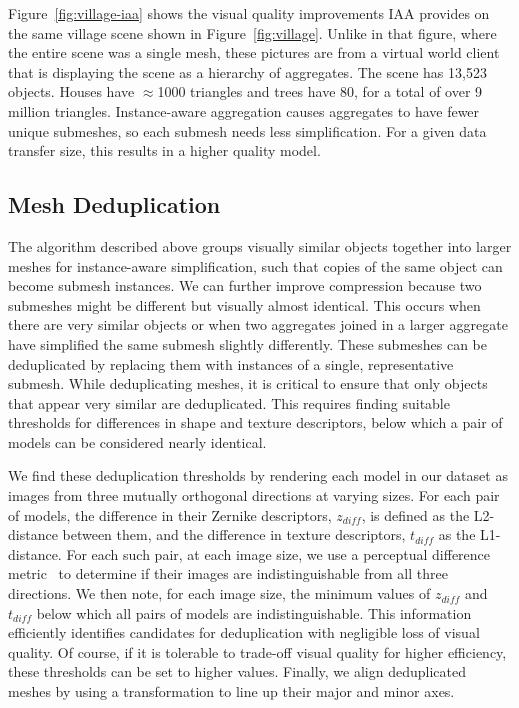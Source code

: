 Figure~\ref{fig:village-iaa} shows the visual quality improvements IAA
provides on the same village scene shown in Figure~\ref{fig:village}.
Unlike in that figure, where the entire scene was a single mesh, these
pictures are from a virtual world client that is displaying the scene
as a hierarchy of aggregates. The scene has 13,523 objects. Houses
have $\approx$1000 triangles and trees have 80, for a total of over 9
million triangles. Instance-aware aggregation causes aggregates to
have fewer unique submeshes, so each submesh needs less
simplification. For a given data transfer size, this results in a
higher quality model.


\subsection{Mesh Deduplication}
\label{sec:deduplication}

The algorithm described above groups visually similar objects
together into larger meshes for instance-aware simplification, such
that copies of the same object can become submesh instances. We can
further improve compression because two submeshes might be different
but visually almost identical. This occurs when there are very similar
objects or when two aggregates joined in a larger aggregate have
simplified the same submesh slightly differently. These submeshes can
be deduplicated by replacing them with instances of a single,
representative submesh.  While deduplicating meshes, it is critical to
ensure that only objects that appear very similar are deduplicated.
This requires finding suitable thresholds for differences in shape and
texture descriptors, below which a pair of models can be considered
nearly identical.

We find these deduplication thresholds by rendering each model in our dataset as
images from three mutually orthogonal directions at varying
sizes. For each pair of
models, the difference in their Zernike descriptors, $z_{diff}$, is
defined as the L2-distance between them, and the difference in texture
descriptors, $t_{diff}$ as the L1-distance. For each such pair,
at each image size, we use a perceptual difference
metric~\cite{perceptual_diff} to determine if their images are
indistinguishable from all three directions. We then note, for each
image size, the minimum values of $z_{diff}$ and $t_{diff}$ below
which all pairs of models are indistinguishable.  This information
efficiently identifies candidates for deduplication with negligible
loss of visual quality. Of course, if it is tolerable to trade-off
visual quality for higher efficiency, these thresholds can be set to
higher values. Finally, we align deduplicated meshes by
using a transformation to line up their major and minor axes.

